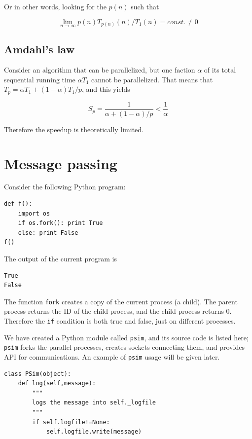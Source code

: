 \documentclass[justified,sixbynine]{tufte-book}
\def\ft{\small\tt}
\theoremstyle{plain}%
\theoremstyle{definition}
\theoremstyle{remark}
\begin{document}
\begin{fullwidth}
Or in other words, looking for the $p(n)$ such that

\begin{equation}
\lim_{n\rightarrow\infty} p(n) T_{p(n)}(n) / T_1(n) = const. \ne 0
\end{equation}

\goodbreak\subsection{Amdahl's law}

Consider an algorithm that can be parallelized, but one faction $\alpha$ of its total sequential running time $\alpha T_1$ cannot be parallelized. That means that $T_p = \alpha T_1 + (1-\alpha) T_1/p$, and this yields~\cite{admhal}

\begin{equation}
S_p = \frac{1}{\alpha+(1-\alpha)/p} < \frac{1}{\alpha}
\end{equation}

Therefore the speedup is theoretically limited.

\goodbreak\section{Message passing}

Consider the following Python program:
\begin{lstlisting}
def f():
    import os
    if os.fork(): print True
    else: print False
f()
\end{lstlisting}
The output of the current program is
\begin{lstlisting}
True
False
\end{lstlisting}

The function {\ft fork} creates a copy of the current process (a child). The parent process returns the ID of the child process, and the child process returns 0. Therefore the {\ft if} condition is both true and false, just on different processes.

We have created a Python module called {\ft psim}, and its source code is listed here; {\ft psim} forks the parallel processes, creates sockets connecting them, and provides API for communications. An example of {\ft psim} usage will be given later.


\begin{lstlisting}[caption={in file: {\ft psim.py}}]
class PSim(object):
    def log(self,message):
        """
        logs the message into self._logfile
        """
        if self.logfile!=None:
            self.logfile.write(message)


\end{lstlisting}
\end{fullwidth}
\end{document}

